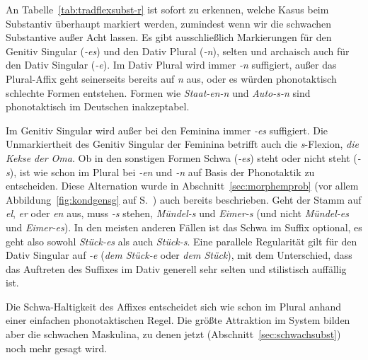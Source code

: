 An Tabelle~\ref{tab:tradflexsubst-r} ist sofort zu erkennen, welche Kasus beim Substantiv überhaupt markiert werden, zumindest wenn wir die schwachen Substantive außer Acht lassen.
Es gibt ausschließlich Markierungen für den Genitiv Singular (\textit{-es}) und den Dativ Plural (\textit{-n}), selten und archaisch auch für den Dativ Singular (\textit{-e}).
Im Dativ Plural wird immer \textit{-n} suffigiert, außer das Plural-Affix geht seinerseits bereits auf \textit{n} aus, oder es würden phonotaktisch schlechte Formen entstehen.
Formen wie \textit{\Ast Staat-en-n} und \textit{\Ast Auto-s-n} sind phonotaktisch im Deutschen inakzeptabel.

Im Genitiv Singular wird außer bei den Feminina immer \textit{-es} suffigiert.
Die Unmarkiertheit des Genitiv Singular der Feminina betrifft auch die \textit{s}-Flexion, \zB \textit{die Kekse der Oma}.
Ob in den sonstigen Formen Schwa (\textit{-es}) steht oder nicht steht (\textit{-s}), ist wie schon im Plural bei \textit{-en} und \textit{-n} auf Basis der Phonotaktik zu entscheiden.
Diese Alternation wurde in Abschnitt~\ref{sec:morphemprob} (vor allem Abbildung~\ref{fig:kondgensg} auf S.~\pageref{fig:kondgensg}) auch bereits beschrieben.
Geht der Stamm auf \textit{el}, \textit{er} oder \textit{en} aus, muss \textit{-s} stehen, \zB \textit{Mündel-s} und \textit{Eimer-s} (und nicht \textit{\Ast Mündel-es} und \textit{\Ast Eimer-es}).
In den meisten anderen Fällen ist das Schwa im Suffix optional, es geht also sowohl \textit{Stück-es} als auch \textit{Stück-s}.
Eine parallele Regularität gilt für den Dativ Singular auf \textit{-e} (\textit{dem Stück-e} oder \textit{dem Stück}), mit dem Unterschied, dass das Auftreten des Suffixes im Dativ generell sehr selten und stilistisch auffällig ist.


Die Schwa-Haltigkeit des Affixes entscheidet sich wie schon im Plural anhand einer einfachen phonotaktischen Regel.
Die größte Attraktion im System bilden aber die schwachen Maskulina, zu denen jetzt (Abschnitt~\ref{sec:schwachsubst}) noch mehr gesagt wird.

